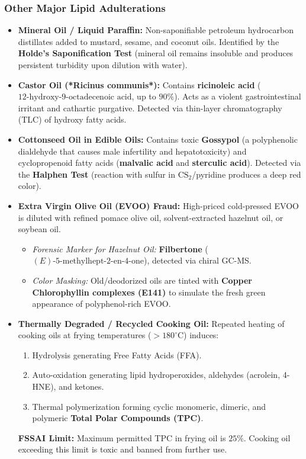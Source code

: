 \documentclass[11pt,a4paper,oneside]{article}
\begin{document}
\subsubsection{Other Major Lipid Adulterations}
\begin{itemize}[leftmargin=*]
    \item \textbf{Mineral Oil / Liquid Paraffin:} Non-saponifiable petroleum hydrocarbon distillates added to mustard, sesame, and coconut oils. Identified by the \textbf{Holde's Saponification Test} (mineral oil remains insoluble and produces persistent turbidity upon dilution with water).
    \item \textbf{Castor Oil (*Ricinus communis*):} Contains \textbf{ricinoleic acid} ($12\text{-hydroxy-9-octadecenoic acid}$, up to $90\%$). Acts as a violent gastrointestinal irritant and cathartic purgative. Detected via thin-layer chromatography (TLC) of hydroxy fatty acids.
    \item \textbf{Cottonseed Oil in Edible Oils:} Contains toxic \textbf{Gossypol} (a polyphenolic dialdehyde that causes male infertility and hepatotoxicity) and cyclopropenoid fatty acids (\textbf{malvalic acid} and \textbf{sterculic acid}). Detected via the \textbf{Halphen Test} (reaction with sulfur in $\mathrm{CS_2}$/pyridine produces a deep red color).
    \item \textbf{Extra Virgin Olive Oil (EVOO) Fraud:} High-priced cold-pressed EVOO is diluted with refined pomace olive oil, solvent-extracted hazelnut oil, or soybean oil.
    \begin{itemize}
        \item \textit{Forensic Marker for Hazelnut Oil:} \textbf{Filbertone} ($(E)\text{-5-methylhept-2-en-4-one}$), detected via chiral GC-MS.
        \item \textit{Color Masking:} Old/deodorized oils are tinted with \textbf{Copper Chlorophyllin complexes (E141)} to simulate the fresh green appearance of polyphenol-rich EVOO.
    \end{itemize}
    \item \textbf{Thermally Degraded / Recycled Cooking Oil:} Repeated heating of cooking oils at frying temperatures ($>180^\circ\text{C}$) induces:
    \begin{enumerate}
        \item Hydrolysis generating Free Fatty Acids (FFA).
        \item Auto-oxidation generating lipid hydroperoxides, aldehydes (acrolein, 4-HNE), and ketones.
        \item Thermal polymerization forming cyclic monomeric, dimeric, and polymeric \textbf{Total Polar Compounds (TPC)}.
    \end{enumerate}
    \textbf{FSSAI Limit:} Maximum permitted TPC in frying oil is \textbf{$25\%$}. Cooking oil exceeding this limit is toxic and banned from further use.
\end{itemize}
\end{document}
